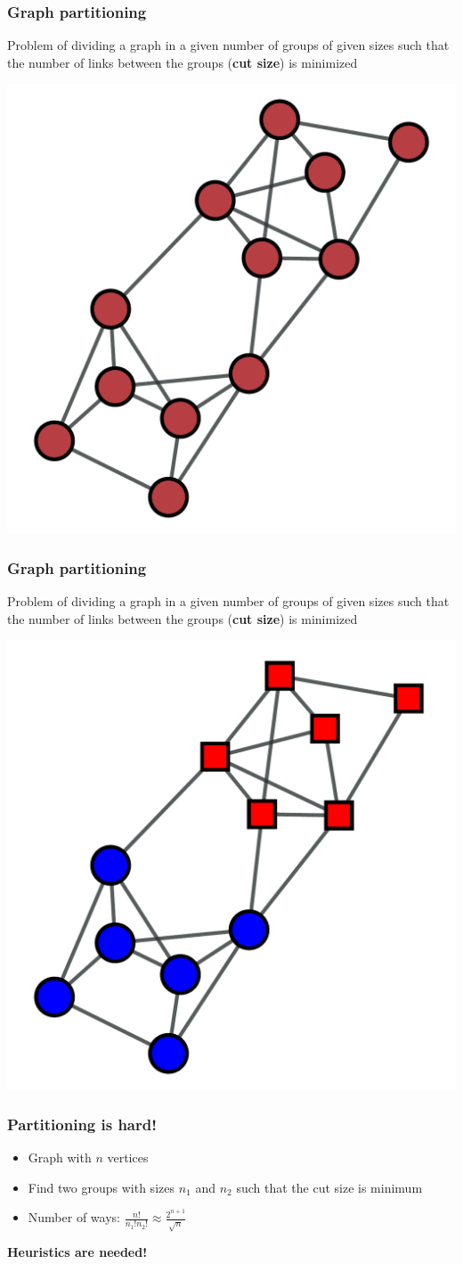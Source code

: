 \documentclass{beamer}
\begin{document}
\begin{frame}
    \frametitle{Graph partitioning}
    \centering
    Problem of dividing a graph in a given number of groups of given sizes such that the number of links between the groups ({\bf cut size}) is minimized

    \includegraphics[width=0.5\columnwidth]{moderate_sized_network1.pdf}
\end{frame}
\begin{frame}
    \frametitle{Graph partitioning}
    \centering
    Problem of dividing a graph in a given number of groups of given sizes such that the number of links between the groups ({\bf cut size}) is minimized

    \includegraphics[width=0.5\columnwidth]{moderate_sized_network2.pdf}
\end{frame}
\begin{frame}
    \frametitle{Partitioning is hard!}
   \centering 
    \begin{itemize}
    \setlength\itemsep{1em}
        \item{Graph with $n$ vertices}
        \item{Find two groups with sizes $n_1$ and $n_2$ such that the cut size is minimum}
        \item{Number of ways: $\frac{n!}{n_1!n_2!}\approx \frac{2^{n+1}}{\sqrt{n}}$}
    \end{itemize}
    \vspace{20pt}
    {\bf Heuristics are needed!}
\end{frame}
\end{document}
